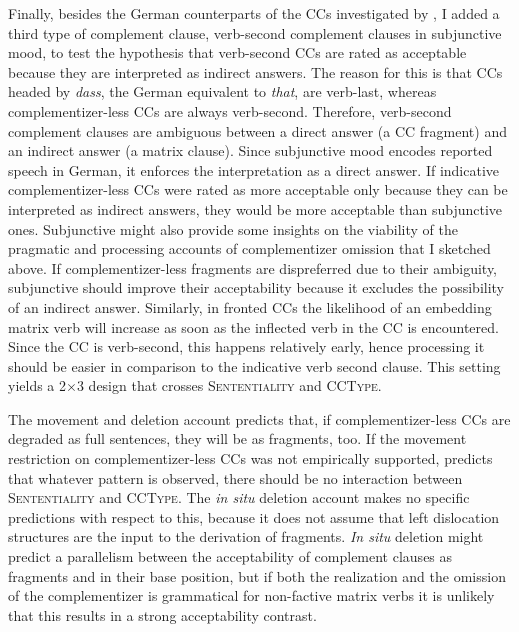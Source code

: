Finally, besides the German counterparts of the CCs investigated by \citet{merchant.etal2013}, I added a third type of complement clause, verb-second complement clauses in subjunctive mood, to test the hypothesis that verb-second CCs are rated as acceptable because they are interpreted as indirect answers. The reason for this is that CCs headed by \textit{dass}, the German equivalent to \textit{that}, are verb-last, whereas complementizer-less CCs are always verb-second. Therefore, verb-second complement clauses are ambiguous between a direct answer (a CC fragment) and an indirect answer (a matrix clause). Since subjunctive mood encodes reported speech in German, it enforces the interpretation as a direct answer. If indicative complementizer-less CCs were rated as more acceptable only because they can be interpreted as indirect answers, they would be more acceptable than subjunctive ones. Subjunctive might also provide some insights on the viability of the pragmatic and processing accounts of complementizer omission that I sketched above. If complementizer-less fragments are dispreferred due to their ambiguity, subjunctive should improve their acceptability because it excludes the possibility of an indirect answer. Similarly, in fronted CCs the likelihood of an embedding matrix verb will increase as soon as the inflected verb in the CC is encountered. Since the CC is verb-second, this happens relatively early, hence processing it should be easier in comparison to the indicative verb second clause. This setting yields a 2$\times$3 design that crosses \textsc{Sententiality} and \textsc{CCType}.

The movement and deletion account predicts that, if complementizer-less CCs are degraded as full sentences, they will be as fragments, too. If the movement restriction on complementizer-less CCs was not empirically supported, \citet{merchant2004} predicts that whatever pattern is observed, there should be no interaction between \textsc{Sententiality} and \textsc{CCType}. The \textit{in situ} deletion account makes no specific predictions with respect to this, because it does not assume that left dislocation structures are the input to the derivation of fragments. \textit{In situ} deletion might predict a parallelism between the acceptability of complement clauses as fragments and in their base position, but if both the realization and the omission of the complementizer is grammatical for non-factive matrix verbs it is unlikely that this results in a strong acceptability contrast.

